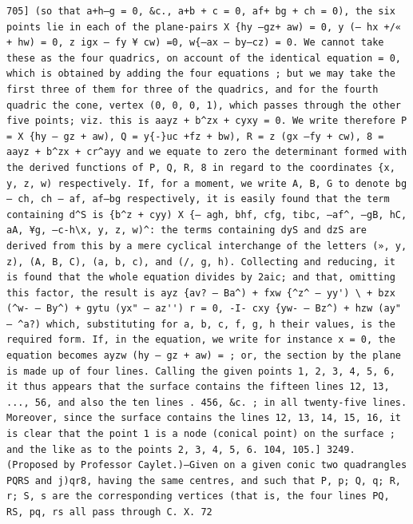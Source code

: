\documentclass[11pt,a4paper]{book}
\begin{document}
\newpage
\setcounter{page}{569}
\begin{verbatim}
705] (so that a+h—g = 0, &c., a+b + c = 0, af+ bg + ch = 0), the six points lie in each of the plane-pairs X {hy —gz+ aw) = 0, y (— hx +/« + hw) = 0, z igx — fy ¥ cw) =0, w{—ax — by—cz) = 0. We cannot take these as the four quadrics, on account of the identical equation = 0, which is obtained by adding the four equations ; but we may take the first three of them for three of the quadrics, and for the fourth quadric the cone, vertex (0, 0, 0, 1), which passes through the other five points; viz. this is aayz + b^zx + cyxy = 0. We write therefore P = X {hy — gz + aw), Q = y{-}uc +fz + bw), R = z (gx —fy + cw), 8 = aayz + b^zx + cr^ayy and we equate to zero the determinant formed with the derived functions of P, Q, R, 8 in regard to the coordinates {x, y, z, w) respectively. If, for a moment, we write A, B, G to denote bg — ch, ch — af, af—bg respectively, it is easily found that the term containing d^S is {b^z + cyy) X {— agh, bhf, cfg, tibc, —af^, —gB, hC, aA, ¥g, —c-h\x, y, z, w)^: the terms containing dyS and dzS are derived from this by a mere cyclical interchange of the letters (», y, z), (A, B, C), (a, b, c), and (/, g, h). Collecting and reducing, it is found that the whole equation divides by 2aic; and that, omitting this factor, the result is ayz {av? — Ba^) + fxw {^z^ — yy') \ + bzx (^w- — By^) + gytu (yx" — az'') r = 0, -I- cxy {yw- — Bz^) + hzw (ay" — ^a?) which, substituting for a, b, c, f, g, h their values, is the required form. If, in the equation, we write for instance x = 0, the equation becomes ayzw (hy — gz + aw) = ; or, the section by the plane is made up of four lines. Calling the given points 1, 2, 3, 4, 5, 6, it thus appears that the surface contains the fifteen lines 12, 13, ..., 56, and also the ten lines . 456, &c. ; in all twenty-five lines. Moreover, since the surface contains the lines 12, 13, 14, 15, 16, it is clear that the point 1 is a node (conical point) on the surface ; and the like as to the points 2, 3, 4, 5, 6. 104, 105.] 3249. (Proposed by Professor Caylet.)—Given on a given conic two quadrangles PQRS and j)qr8, having the same centres, and such that P, p; Q, q; R, r; S, s are the corresponding vertices (that is, the four lines PQ, RS, pq, rs all pass through C. X. 72 
\end{verbatim}
\end{document}
